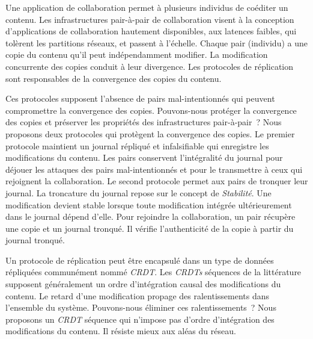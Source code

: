 \begin{ThesisAbstract}
\begin{FrenchAbstract}
Une application de collaboration permet à plusieurs individus de coéditer un contenu.
Les infrastructures pair-à-pair de collaboration visent à la conception d’applications de collaboration hautement disponibles, aux latences faibles, qui tolèrent les partitions réseaux, et passent à l’échelle.
Chaque pair (individu) a une copie du contenu qu’il peut indépendamment modifier.
La modification concurrente des copies conduit à leur divergence.
Les protocoles de réplication sont responsables de la convergence des copies du contenu.

Ces protocoles supposent l'absence de pairs mal-intentionnés qui peuvent compromettre la convergence des copies.
Pouvons-nous protéger la convergence des copies et préserver les propriétés des infrastructures pair-à-pair~?
Nous proposons deux protocoles qui protègent la convergence des copies.
Le premier protocole maintient un journal répliqué et infalsifiable qui enregistre les modifications du contenu.
Les pairs conservent l’intégralité du journal pour déjouer les attaques des pairs mal-intentionnés et pour le transmettre à ceux qui rejoignent la collaboration.
Le second protocole permet aux pairs de tronquer leur journal.
La troncature du journal repose sur le concept de \emph{Stabilité}.
Une modification devient stable lorsque toute modification intégrée ultérieurement dans le journal dépend d'elle.
Pour rejoindre la collaboration, un pair récupère une copie et un journal tronqué.
Il vérifie l'authenticité de la copie à partir du journal tronqué.

Un protocole de réplication peut être encapsulé dans un type de données répliquées communément nommé \emph{CRDT}.
Les \emph{CRDTs} séquences de la littérature supposent généralement un ordre d'intégration causal des modifications du contenu.
Le retard d'une modification propage des ralentissements dans l'ensemble du système.
Pouvons-nous éliminer ces ralentissements~?
Nous proposons un \emph{CRDT} séquence qui n'impose pas d'ordre d'intégration des modifications du contenu.
Il résiste mieux aux aléas du réseau.

\end{FrenchAbstract}

\end{ThesisAbstract}